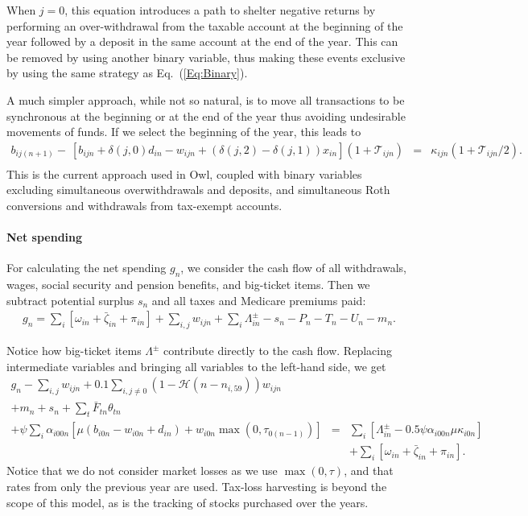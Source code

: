 \documentclass{report}[fleqn,11pt]
\begin{document}
	When $j=0$, this equation introduces
	a path to shelter negative returns by performing an over-withdrawal from the taxable
	account at the beginning of the year followed by a deposit in the
	same account at the end of the year. This can 
	be removed by using another binary variable, thus making these events exclusive by using
	the same strategy as Eq.~(\ref{Eq:Binary}).

	A much simpler approach, while not so natural,
	is to move all transactions to be synchronous at the beginning or at the end of the year
	thus avoiding undesirable movements of funds.
	If we select the beginning of the year, this leads to
	\begin{eqnarray}
		\label{Eq:C3b}
		b_{ij(n+1)}
		- \ [b_{ijn} + \delta(j, 0)d_{in} - w_{ijn} + (\delta(j, 2) - \delta(j, 1))x_{in}]
		(1 + \mathcal{T}_{ijn})
		&=& \kappa_{ijn} (1 + \mathcal{T}_{ijn}/2).
		\nonumber \\
	\end{eqnarray}
This is the current approach used in Owl, coupled with
binary variables excluding simultaneous overwithdrawals and deposits, and
simultaneous Roth conversions and withdrawals from tax-exempt accounts.

\paragraph*{Net spending}
	For calculating the net spending $g_n$, we consider the cash flow of all withdrawals,
	wages, social security and pension benefits, and big-ticket items. 
	Then we subtract potential surplus $s_{n}$ and all taxes and Medicare premiums paid:
	\begin{eqnarray}
		g_n = \sum_i [\omega_{in} + \bar{\zeta}_{in} + \pi_{in} ] 
		+ \sum_{i,j} w_{ijn} + \sum_i \Lambda^\pm_{in} - s_{n}
		- P_n - T_n - U_n - m_n.
	\end{eqnarray}

	Notice how big-ticket items $\Lambda^\pm$ contribute directly to the cash flow.
	Replacing intermediate variables and bringing all variables to the left-hand side, we get
	\begin{eqnarray}
		\label{Eq:C4}
		g_n - \sum_{i,j} w_{ijn} + 0.1 \sum_{i,j\neq0} (1-\mathcal{H}(n - n_{i, 59})) w_{ijn}\nonumber\\
                + m_n + s_n + \sum_t \bar{F}_{tn} \theta_{t n} &&\nonumber \\
		+ \psi\sum_i \alpha_{i00n} \left[\mu(b_{i0n} - w_{i0n} + d_{in})
		+ w_{i0n}\max(0, \tau_{0(n-1)})\right] 
		&=& \sum_i [\Lambda^\pm_{in} - 0.5\psi\alpha_{i00n}\mu\kappa_{i0n}] \nonumber\\
                && + \sum_i [\omega_{in} + \bar{\zeta}_{in} + \pi_{in} ].
	\end{eqnarray}
	Notice that we do not consider market losses as we use $\max(0, \tau)$, and that
	rates from only the previous year are used. Tax-loss
	harvesting is beyond the scope of this model, as is the tracking of stocks
	purchased over the years.
\end{document}
